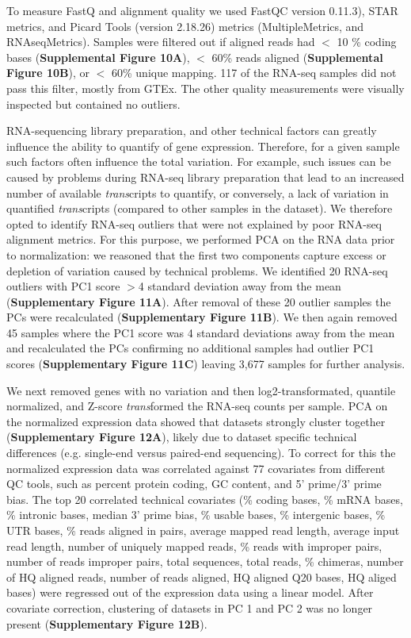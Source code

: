 {To measure FastQ and alignment quality we used FastQC\cite{BabrahamBioinformaticsFastQC} version 0.11.3), STAR metrics, and Picard Tools\cite{broadinstitutePicardTools2019} (version 2.18.26) metrics (MultipleMetrics, and RNAseqMetrics). Samples were filtered out if aligned reads had $<$ 10
\% coding bases (\textbf{Supplemental Figure 10A}), $<$ 60\% reads aligned (\textbf{Supplemental Figure 10B}), or $<$ 60\% unique mapping. 117 of the RNA-seq samples did not pass this filter, mostly from GTEx\cite{consortiumGTExConsortiumAtlas2020}. The other quality measurements were visually inspected but contained no outliers. 

RNA-sequencing library preparation, and other technical factors can greatly influence the ability to quantify of gene expression. Therefore, for a given sample such factors often influence the total variation. For example, such issues can be caused by problems during RNA-seq library preparation that lead to an increased number of available \emph{trans}cripts to quantify, or conversely, a lack of variation in quantified \emph{trans}cripts (compared to other samples in the dataset). We therefore opted to identify RNA-seq outliers that were not explained by poor RNA-seq alignment metrics. For this purpose, we performed PCA on the RNA data prior to normalization: we reasoned that the first two components capture excess or depletion of variation caused by technical problems. We identified 20 RNA-seq outliers with PC1 score $>$4 standard deviation away from the mean (\textbf{Supplementary Figure 11A}). After removal of these 20 outlier samples the PCs were recalculated (\textbf{Supplementary Figure 11B}). We then again removed 45 samples where the PC1 score was 4 standard deviations away from the mean and recalculated the PCs confirming no additional samples had outlier PC1 scores (\textbf{Supplementary Figure 11C}) leaving 3,677 samples for further analysis. 



We next removed genes with no variation and then log2-transformated, quantile normalized, and Z-score \emph{trans}formed the RNA-seq counts per sample. PCA on the normalized expression data showed that datasets strongly cluster together (\textbf{Supplementary Figure 12A}), likely due to dataset specific technical differences (e.g. single-end versus paired-end sequencing). To correct for this the normalized expression data was correlated against 77 covariates from different QC tools, such as percent protein coding, GC content, and 5’ prime/3’ prime bias. The top 20 correlated technical covariates (\% coding bases, \% mRNA bases, \% intronic bases, median 3’ prime bias, \% usable bases, \% intergenic bases, \% UTR bases, \% reads aligned in pairs, average mapped read length, average input read length, number of uniquely mapped reads, \% reads with improper pairs, number of reads improper pairs, total sequences, total reads, \% chimeras, number of HQ aligned reads, number of reads aligned, HQ aligned Q20 bases, HQ aliged bases) were regressed out of the expression data using a linear model. After covariate correction, clustering of datasets in PC 1 and PC 2 was no longer present (\textbf{Supplementary Figure 12B}).  

}
